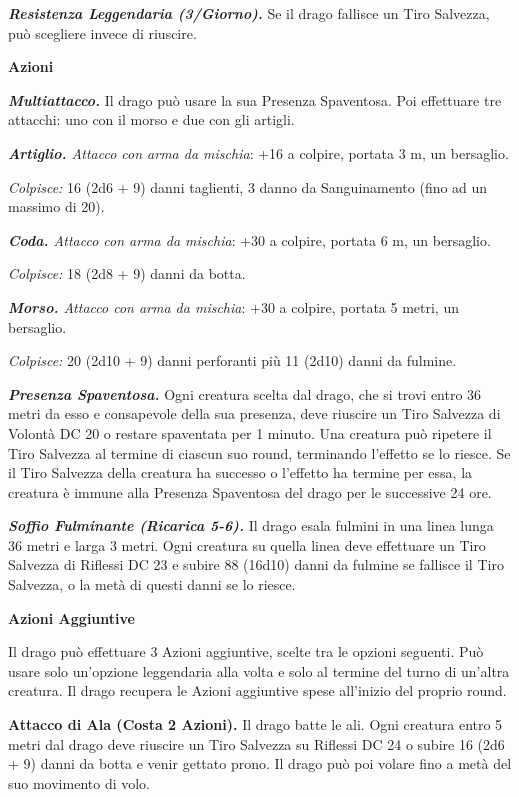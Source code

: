 \begin{multicols}{2}
	\textit{\textbf{Resistenza Leggendaria (3/Giorno).}} Se il drago fallisce un Tiro Salvezza, può scegliere invece di riuscire.

	\textbf{Azioni}

	\textit{\textbf{Multiattacco.}} Il drago può usare la sua Presenza Spaventosa. Poi effettuare tre attacchi: uno con il morso e due con gli artigli.

	\textit{\textbf{Artiglio.} Attacco con arma da mischia}: +16 a colpire,
	portata 3 m, un bersaglio.

	\textit{Colpisce:} 16 (2d6 + 9) danni taglienti, 3 danno da Sanguinamento (fino ad un massimo di 20).

	\textit{\textbf{Coda.} Attacco con arma da mischia}: +30 a colpire, portata 6 m, un bersaglio.

	\textit{Colpisce:} 18 (2d8 + 9) danni da botta.

	\textit{\textbf{Morso.} Attacco con arma da mischia}: +30 a colpire, portata 5 metri, un bersaglio.

	\textit{Colpisce:} 20 (2d10 + 9) danni perforanti più 11 (2d10) danni da fulmine.

	\textit{\textbf{Presenza Spaventosa.}} Ogni creatura scelta dal drago, che si trovi entro 36 metri da esso e consapevole della sua presenza, deve riuscire un Tiro Salvezza di Volontà DC 20 o restare spaventata per 1 minuto. Una creatura può ripetere il Tiro Salvezza al termine di ciascun suo round, terminando l'effetto se lo riesce. Se il Tiro Salvezza della creatura ha successo o l'effetto ha termine per essa, la creatura è immune alla Presenza Spaventosa del drago per le successive 24 ore.

	\textit{\textbf{Soffio Fulminante (Ricarica 5-6).}} Il drago esala fulmini in una linea lunga 36 metri e larga 3 metri. Ogni creatura su quella linea deve effettuare un Tiro Salvezza di Riflessi DC 23 e subire 88 (16d10) danni da fulmine se fallisce il Tiro Salvezza, o la metà di questi danni se lo riesce.

	\textbf{Azioni Aggiuntive}

	Il drago può effettuare 3 Azioni aggiuntive, scelte tra le opzioni seguenti. Può usare solo un'opzione leggendaria alla volta e solo al termine del turno di un'altra creatura. Il drago recupera le Azioni aggiuntive spese all'inizio del proprio round.

	\textbf{Attacco di Ala (Costa 2 Azioni).} Il drago batte le ali. Ogni creatura entro 5 metri dal drago deve riuscire un Tiro Salvezza su Riflessi DC 24 o subire 16 (2d6 + 9) danni da botta e venir gettato prono. Il drago può poi volare fino a metà del suo movimento di volo.


\end{multicols}
